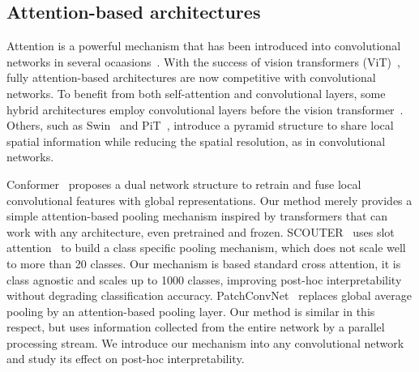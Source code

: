 
\subsection{Attention-based architectures}

Attention is a powerful mechanism that has been introduced into convolutional networks in several ocaasions~\citep{bello2019attention, ramachandran2019stand, shen2020global}. With the success of vision transformers (ViT)~\citep{dosovitskiy2020image}, fully attention-based architectures are now competitive with convolutional networks. To benefit from both self-attention and convolutional layers, some hybrid architectures employ convolutional layers before the vision transformer~\citep{graham2021levit,xiao2021early}. Others, such as Swin~\citep{liu2021swin} and PiT~\citep{heo2021rethinking}, introduce a pyramid structure to share local spatial information while reducing the spatial resolution, as in convolutional networks. 

Conformer~\citep{peng2021conformer} proposes a dual network structure to retrain and fuse local convolutional features with global representations. Our method merely provides a simple attention-based pooling mechanism inspired by transformers that can work with any architecture, even pretrained and frozen. SCOUTER~\citep{li2021scouter} uses slot attention~\cite{locatello2020object} to build a class specific pooling mechanism, which does not scale well to more than 20 classes. Our mechanism is based standard cross attention, it is class agnostic and scales up to 1000 classes, improving post-hoc interpretability without degrading classification accuracy. PatchConvNet~\citep{touvron2021augmenting} replaces global average pooling by an attention-based pooling layer. Our method is similar in this respect, but uses information collected from the entire network by a parallel processing stream. We introduce our mechanism into any convolutional network and study its effect on post-hoc interpretability.








